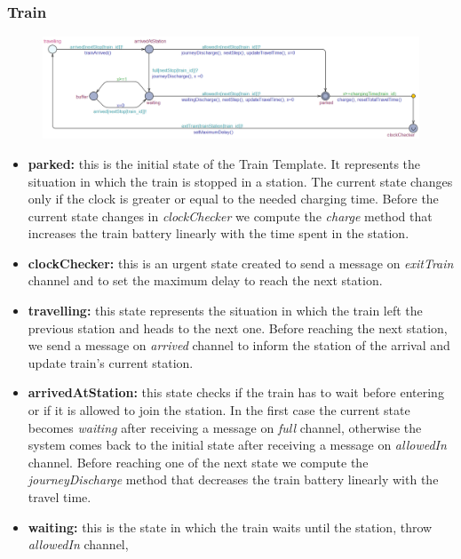 \subsubsection{Train}
\begin{figure}[H]
    \centering
    \includegraphics[scale=0.56]{images/trainTemplate.png}
\end{figure}

\begin{itemize}
    \item \textbf{parked: }this is the initial state of the Train Template. It represents the situation in which the train is
            stopped in a station. The current state changes only if the clock is greater or equal to the needed charging time.
            Before the current state changes in \emph{clockChecker} we compute the \emph{charge} method that increases the
            train battery linearly with the time spent in the station.
    \item \textbf{clockChecker: }this is an urgent state created to send a message on \emph{exitTrain} channel and to set
            the maximum delay to reach the next station.
    \item \textbf{travelling: }this state represents the situation in which the train left the previous station and heads to
            the next one. Before reaching the next station, we send a message on \emph{arrived} channel to inform the station
            of the arrival and update train's current station.
    \item \textbf{arrivedAtStation: }this state checks if the train has to wait before entering or if it is allowed to join 
            the station. In the first case the current state becomes \emph{waiting} after receiving a message on \emph{full}
            channel, otherwise the system comes back to the initial state after receiving a message on \emph{allowedIn} channel.
            Before reaching one of the next state we compute the \textit{journeyDischarge} method that decreases
            the train battery linearly with the travel time.
    \item \textbf{waiting: }this is the state in which the train waits until the station, throw \emph{allowedIn} channel,

\end{itemize}
